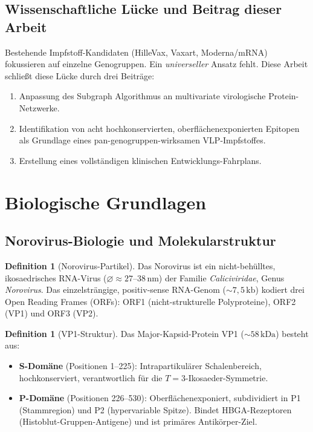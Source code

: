 ﻿\documentclass[a4paper,12pt]{article}
\theoremstyle{plain}
\theoremstyle{definition}
\newtheorem{definition}[satz]{Definition}
\theoremstyle{remark}
\begin{document}
\subsection{Wissenschaftliche Lücke und Beitrag dieser Arbeit}

Bestehende Impfstoff-Kandidaten (HilleVax, Vaxart, Moderna/mRNA) fokussieren auf einzelne
Genogruppen. Ein \emph{universeller} Ansatz fehlt. Diese Arbeit schließt diese Lücke durch
drei Beiträge:

\begin{enumerate}[label=(\roman*)]
  \item Anpassung des Subgraph Algorithmus \citep{epp2026subgraph} an multivariate
        virologische Protein-Netzwerke.
  \item Identifikation von acht hochkonservierten, oberflächenexponierten Epitopen als
        Grundlage eines pan-genogruppen-wirksamen VLP-Impfstoffes.
  \item Erstellung eines vollständigen klinischen Entwicklungs-Fahrplans.
\end{enumerate}

\section{Biologische Grundlagen}

\subsection{Norovirus-Biologie und Molekularstruktur}

\begin{definition}[Norovirus-Partikel]
Das Norovirus ist ein nicht-behülltes, ikosaedrisches RNA-Virus ($\varnothing\approx 27$--$38\,\text{nm}$)
der Familie \textit{Caliciviridae}, Genus \textit{Norovirus}. Das einzelsträngige, positiv-sense
RNA-Genom ($\sim\!7{,}5\,\text{kb}$) kodiert drei Open Reading Frames (ORFs):
ORF1 (nicht-strukturelle Polyproteine), ORF2 (VP1) und ORF3 (VP2).
\end{definition}

\begin{definition}[VP1-Struktur]
Das Major-Kapsid-Protein VP1 (${\sim}58\,\text{kDa}$) besteht aus:
\begin{itemize}
  \item \textbf{S-Domäne} (Positionen 1--225): Intrapartikulärer Schalenbereich,
        hochkonserviert, verantwortlich für die $T=3$-Ikosaeder-Symmetrie.
  \item \textbf{P-Domäne} (Positionen 226--530): Oberflächenexponiert,
        subdividiert in P1 (Stammregion) und P2 (hypervariable Spitze).
        Bindet HBGA-Rezeptoren (Histoblut-Gruppen-Antigene) und ist primäres
        Antikörper-Ziel.
\end{itemize}
\end{definition}
\end{document}
